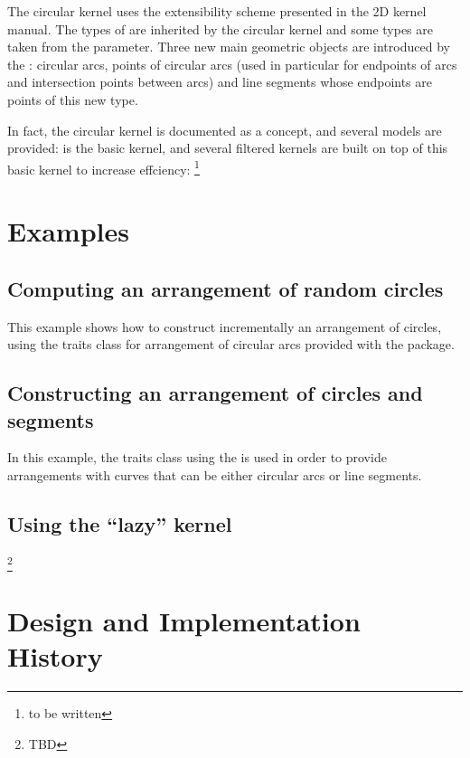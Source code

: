 The circular kernel uses the extensibility scheme presented in the 2D
kernel manual. The types of  are inherited
by the circular kernel and some types are taken from the
 parameter. Three new main geometric objects are
introduced by the : circular arcs, points of
circular arcs (used in particular for endpoints of arcs and
intersection points between arcs) and line segments whose endpoints
are points of this new type.  

In fact, the circular kernel is documented as a concept, and several
models are provided:  is the basic kernel, and
several filtered kernels are built on top of this basic kernel to
increase effciency: \footnote{to be written}

\section{Examples}

	\subsection{Computing an arrangement of random circles} 

This example shows how to construct incrementally an arrangement of
circles, using the traits class for arrangement of circular arcs
provided with the package.


	\subsection{Constructing an arrangement of circles and segments} 

In this example, the traits class using the
is used in order to provide arrangements with curves that can be
either circular arcs or line segments.


	\subsection{Using the ``lazy'' kernel} 
\footnote{TBD}

\section{Design and Implementation History}
